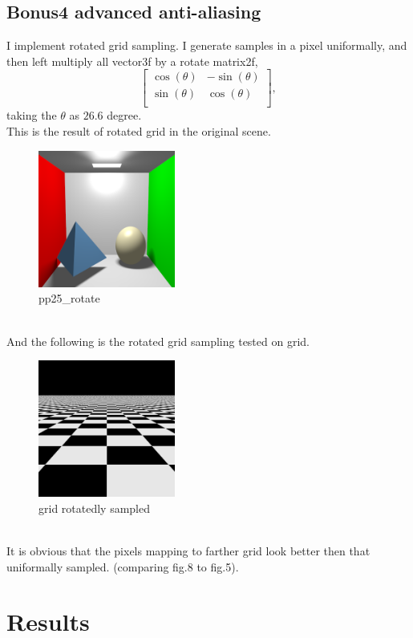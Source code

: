 \documentclass[acmtog]{acmart}
\begin{document}
\subsection{Bonus4 advanced anti-aliasing}
I implement rotated grid sampling.
I generate samples in a pixel uniformally, and then left multiply all vector3f by a rotate matrix2f,
$$\begin{bmatrix}
	\cos(\theta)&-\sin(\theta)\\
	\sin(\theta)&\cos(\theta)\\
\end{bmatrix},$$
taking the $\theta$ as $26.6$ degree.\\
This is the result of rotated grid in the original scene.
\begin{figure}[h]
	\includegraphics[width=4.5cm,height=4.5cm]{pp25_rotate.png}
	\caption{pp25\_rotate}
\end{figure}\\
And the following is the rotated grid sampling tested on grid.
\begin{figure}[h]
	\includegraphics[width=4.5cm,height=4.5cm]{ground_rotate.png}
	\caption{grid rotatedly sampled}
\end{figure}\\
It is obvious that the pixels mapping to farther grid look better then that uniformally sampled. (comparing fig.8 to fig.5).
\section{Results}
\end{document}
